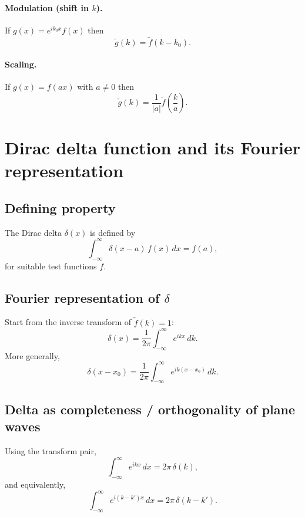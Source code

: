 \paragraph{Modulation (shift in $k$).}
If $g(x)=e^{ik_0 x}f(x)$ then
\begin{equation}
\tilde g(k) = \tilde f(k-k_0).
\end{equation}

\paragraph{Scaling.}
If $g(x)=f(ax)$ with $a\neq 0$ then
\begin{equation}
\tilde g(k)=\frac{1}{|a|}\tilde f\!\left(\frac{k}{a}\right).
\end{equation}


\section{Dirac delta function and its Fourier representation}

\subsection{Defining property}
The Dirac delta $\delta(x)$ is defined by
\begin{equation}
\int_{-\infty}^{\infty}\delta(x-a)\,f(x)\,dx = f(a),
\end{equation}
for suitable test functions $f$.

\subsection{Fourier representation of $\delta$}
Start from the inverse transform of $\tilde f(k)=1$:
\begin{equation}
\delta(x) = \frac{1}{2\pi}\int_{-\infty}^{\infty} e^{ikx}\,dk.
\end{equation}
More generally,
\begin{equation}
\delta(x-x_0) = \frac{1}{2\pi}\int_{-\infty}^{\infty} e^{ik(x-x_0)}\,dk.
\end{equation}

\subsection{Delta as completeness / orthogonality of plane waves}
Using the transform pair,
\begin{equation}
\int_{-\infty}^{\infty} e^{ikx}\,dx = 2\pi\,\delta(k),
\end{equation}
and equivalently,
\begin{equation}
\int_{-\infty}^{\infty} e^{i(k-k')x}\,dx = 2\pi\,\delta(k-k').
\end{equation}

